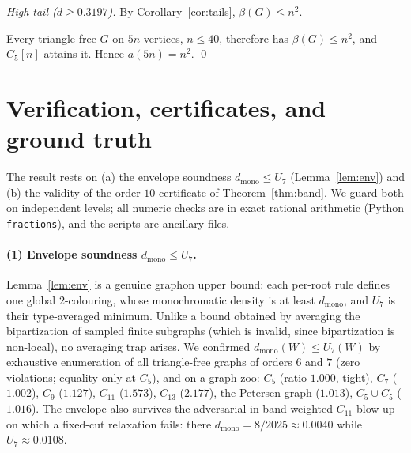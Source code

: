 \documentclass[11pt]{article}
\theoremstyle{remark}
\newcommand{\bip}{\beta}
\newcommand{\dmono}{d_{\mathrm{mono}}}
\begin{document}
\smallskip\noindent\emph{High tail ($d\ge 0.3197$).} By
Corollary~\ref{cor:tails}, $\bip(G)\le n^2$.

\smallskip Every triangle-free $G$ on $5n$ vertices, $n\le 40$, therefore has
$\bip(G)\le n^2$, and $C_5[n]$ attains it. Hence $a(5n)=n^2$. \qed

\section{Verification, certificates, and ground truth}\label{sec:verification}

The result rests on (a) the envelope soundness $\dmono\le U_7$
(Lemma~\ref{lem:env}) and (b) the validity of the order-$10$ certificate of
Theorem~\ref{thm:band}. We guard both on independent levels; all numeric checks are
in exact rational arithmetic (Python \texttt{fractions}), and the scripts are
ancillary files.

\paragraph{(1) Envelope soundness $\dmono\le U_7$.} Lemma~\ref{lem:env} is a
genuine graphon upper bound: each per-root rule defines one global $2$-colouring,
whose monochromatic density is at least $\dmono$, and $U_7$ is their type-averaged
minimum. Unlike a bound obtained by averaging the bipartization of sampled finite
subgraphs (which is invalid, since bipartization is non-local), no averaging trap
arises. We confirmed $\dmono(W)\le U_7(W)$ by exhaustive enumeration of all
triangle-free graphs of orders $6$ and $7$ (zero violations; equality only at
$C_5$), and on a graph zoo: $C_5$ (ratio $1.000$, tight), $C_7$ ($1.002$), $C_9$
($1.127$), $C_{11}$ ($1.573$), $C_{13}$ ($2.177$), the Petersen graph ($1.013$),
$C_5\cup C_5$ ($1.016$). The envelope also survives the adversarial in-band
weighted $C_{11}$-blow-up on which a fixed-cut relaxation fails: there
$\dmono=8/2025\approx 0.0040$ while $U_7\approx 0.0108$.
\end{document}
